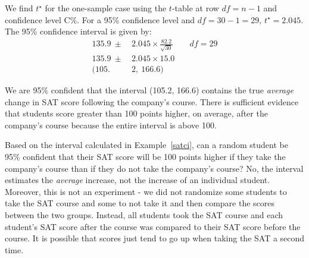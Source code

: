 \begin{examplewrap}
\begin{nexample}
\begin{description}
We find $t^{\star}$ for the one-sample case using the $t$-table at row $df = n -1$ and confidence level C\%.  For a 95\% confidence level and $df = 30 - 1 = 29$, $t^{\star} = 2.045$.\\

The 95\% confidence interval is given by:
\begin{align*}
135.9 \ \pm\  &2.045\times  \frac{82.2}{\sqrt{30}}  \qquad df = 29\\
135.9 \ \pm\  &2.045\times 15.0 \\
(105.&2,\ 166.6)
\end{align*}
\item[\inferencestep{Conclude}]  We are 95\% confident that the interval (105.2, 166.6) contains the true \emph{average} change in SAT score following the company's course.  There is sufficient evidence that students score greater than 100 points higher, on average, after the company's course because the entire interval is above 100.  
\end{description}
\label{satci}
\end{nexample}
\end{examplewrap}


\begin{examplewrap}
\begin{nexample}
{Based on the interval calculated in Example~\ref{satci}, can a random student be 95\% confident that their SAT score will be 100 points higher if they take the company's course than if they do not take the company's course?}
No, the interval estimates the \emph{average} increase, not the increase of an individual student.   Moreover, this is not an experiment - we did not randomize some students to take the SAT course and some to not take it and then compare the scores between the two groups.  Instead, all students took the SAT course and each student's SAT score after the course was compared to their SAT score before the course.  It is possible that scores just tend to go up when taking the SAT a second time.  
\end{nexample}
\end{examplewrap}

\newpage

